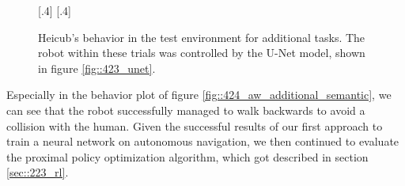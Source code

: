 \begin{figure}[h!]
	\centering
	[.4\linewidth]{}
	[.4\linewidth]{}
	\caption{Heicub's behavior in the test environment for additional tasks. The robot within these trials was controlled by the U-Net model, shown in figure \ref{fig::423_unet}.}
\label{fig::424_aw_gif_additional}
\end{figure} 
Especially in the behavior plot of figure \ref{fig::424_aw_additional_semantic}, we can see that the robot successfully managed to walk backwards to avoid a collision with the human. Given the successful results of our first approach to train a neural network on autonomous navigation, we then continued to evaluate the proximal policy optimization algorithm, which got described in section \ref{sec::223_rl}.
